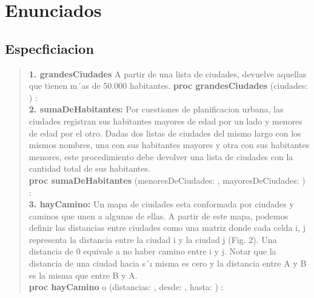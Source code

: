 \documentclass[10pt,a4paper]{article}
\begin{document}
\maketitle
\section {Enunciados}
\subsection{Especficiacion}

\begin{quote}
\vspace{0.2cm}
\textbf{1. grandesCiudades} A partir de una lista de ciudades, devuelve aquellas que tienen m´as de 50.000 habitantes.
\textbf {proc  grandesCiudades} (\In ciudades: ) : 
\vspace{0.2cm}
\\
\vspace{0.2cm}
\textbf{2. sumaDeHabitantes:} Por cuestiones de planificacion urbana, las ciudades registran sus habitantes mayores de edad
por un lado y menores de edad por el otro. Dadas dos listas de ciudades del mismo largo con los mismos nombres, una
con sus habitantes mayores y otra con sus habitantes menores, este procedimiento debe devolver una lista de ciudades
con la cantidad total de sus habitantes.
\\
\vspace{0.2cm}
\textbf {proc sumaDeHabitantes} (\In menoresDeCiudades: , \In mayoresDeCiudades: ) : 
\\
\vspace{0.2cm}
\textbf{3. hayCamino:} Un mapa de ciudades esta conformada por ciudades y caminos que unen a algunas de ellas. A partir de
este mapa, podemos definir las distancias entre ciudades como una matriz donde cada celda i, j representa la distancia
entre la ciudad i y la ciudad j (Fig. 2). Una distancia de 0 equivale a no haber camino entre i y j. Notar que la distancia
de una ciudad hacia s´ı misma es cero y la distancia entre A y B es la misma que entre B y A.
\vspace{0.2cm}
\\ 
\vspace{0.2cm}
\textbf{proc hayCamino} o (\In distancias: \matriz{\ent}, \In desde: \ent, \In hasta: \ent) : \bool
\vspace{0.2cm}
\\
\vspace{0.2cm}

\end{quote}
\end{document}
